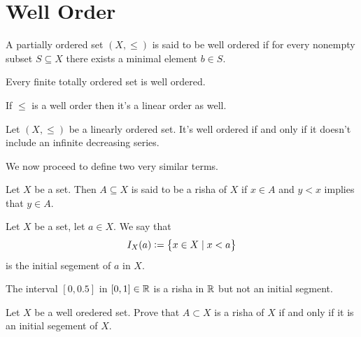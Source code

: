 \documentclass[11pt,a4paper]{article}
\begin{document}
\newpage

\section{Well Order}
\begin{definition}
A partially ordered set $(X,\le)$ is said to be well ordered if for every 
nonempty subset $S \subseteq X$ there exists a minimal element $b \in S$.
\end{definition}

\begin{proposition}
  Every finite totally ordered set is well ordered.
\end{proposition}

\begin{proposition}
  If $\le$ is a well order then it's a linear order as well.
\end{proposition}

\begin{proposition}
  Let  $(X,\le)$ be a linearly ordered set. It's well ordered
  if and only if it doesn't include an infinite decreasing series.
\end{proposition}

We now proceed to define two very similar terms.
\begin{definition}[Risha]
Let $X$ be a set.
Then $A \subseteq X$ is said to be a risha of $X$
if $x \in A$ and $y < x$ implies that $y \in A$.
\end{definition}

\begin{definition}
  Let $X$ be a set, let $a \in X$.
  We say that
  \[
    I_X(a) := \set{x \in X \mid x < a}
  \]
  is the initial segement of $a$ in $X$.
\end{definition}

\begin{remark}
The interval $[0,0.5]$ in $[0,1]\in\mathbb{R}$ is a risha in $\mathbb{R}$ but not an initial 
segment.
\end{remark}

\begin{proposition}
  Let $X$ be a well oredered set.
  Prove that $A \subset X$ is a risha of $X$ if and only if it is an
  initial segement of $X$.
\end{proposition}
\end{document}
